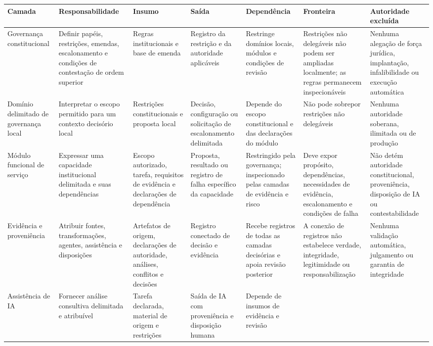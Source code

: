 \documentclass[11pt]{article}
\begin{document}
\begin{landscape}
\begin{center}
\scriptsize
\begin{tabularx}{\linewidth}{|X|X|X|X|X|X|X|}
\hline
\textbf{Camada} & \textbf{Responsabilidade} & \textbf{Insumo} & \textbf{Saída} &
\textbf{Dependência} & \textbf{Fronteira} & \textbf{Autoridade excluída} \\
\hline
Governança constitucional & Definir papéis, restrições, emendas,
escalonamento e condições de contestação de ordem superior & Regras
institucionais e base de emenda & Registro da restrição e da autoridade
aplicáveis & Restringe domínios locais, módulos e condições de revisão &
Restrições não delegáveis não podem ser ampliadas localmente; as regras
permanecem inspecionáveis & Nenhuma alegação de força jurídica, implantação,
infalibilidade ou execução automática \\
\hline
Domínio delimitado de governança local & Interpretar o escopo permitido para
um contexto decisório local & Restrições constitucionais e proposta local &
Decisão, configuração ou solicitação de escalonamento delimitada & Depende do
escopo constitucional e das declarações do módulo & Não pode sobrepor
restrições não delegáveis & Nenhuma autoridade soberana, ilimitada ou de
produção \\
\hline
Módulo funcional de serviço & Expressar uma capacidade institucional delimitada
e suas dependências & Escopo autorizado, tarefa, requisitos de evidência e
declarações de dependência & Proposta, resultado ou registro de falha específico
da capacidade & Restringido pela governança; inspecionado pelas camadas de
evidência e risco & Deve expor propósito, dependências, necessidades de
evidência, escalonamento e condições de falha & Não detém autoridade
constitucional, proveniência, disposição de IA ou contestabilidade \\
\hline
Evidência e proveniência & Atribuir fontes, transformações, agentes,
assistência e disposições & Artefatos de origem, declarações de autoridade,
análises, conflitos e decisões & Registro conectado de decisão e evidência &
Recebe registros de todas as camadas decisórias e apoia revisão posterior & A
conexão de registros não estabelece verdade, integridade, legitimidade ou
responsabilização & Nenhuma validação automática, julgamento ou garantia de
integridade \\
\hline
Assistência de IA & Fornecer análise consultiva delimitada e atribuível &
Tarefa declarada, material de origem e restrições & Saída de IA com
proveniência e disposição humana & Depende de insumos de evidência e revisão

\end{tabularx}
\end{center}
\end{landscape}
\end{document}

